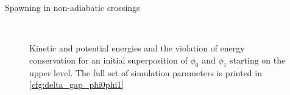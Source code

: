 \begin{chapter}{Spawning in non-adiabatic crossings}
\begin{figure}[h!]
  \centering
   \\
  \caption[Energies for a superposition of $\phi_0$ and $\phi_1$ in an avoided crossing]{
  Kinetic and potential energies and the violation of energy conservation for an
  initial superposition of $\phi_0$ and $\phi_1$ starting on the upper level. The
  full set of simulation parameters is printed in \ref{cfg:delta_gap_phi0phi1}
  \label{fig:basic_delta_gap_phi0phi1_energies}
  }
\end{figure}




\end{chapter}

